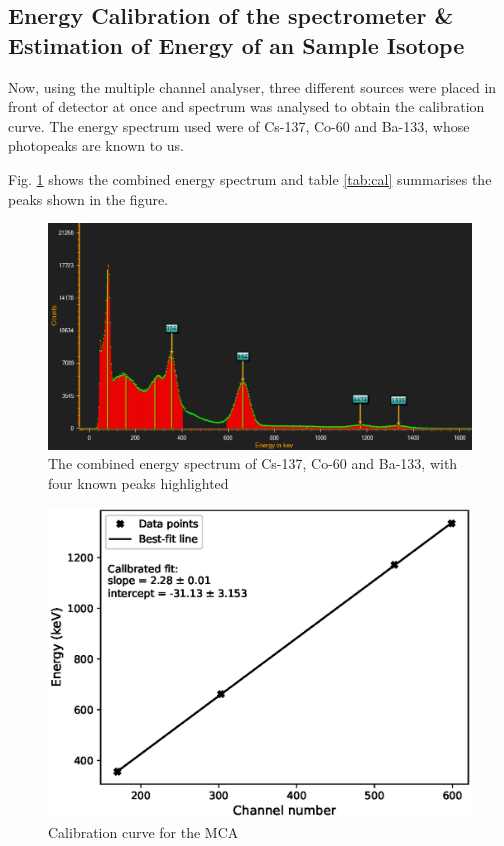 \subsection{Energy Calibration of the spectrometer \& Estimation of Energy of an Sample Isotope}

Now, using the multiple channel analyser, three different sources were placed in front of detector at once and spectrum was analysed to obtain the calibration curve. The energy spectrum used were of Cs-137, Co-60 and Ba-133, whose photopeaks are known to us.

Fig. \ref{cal} shows the combined energy spectrum and table \ref{tab:cal} summarises the peaks shown in the figure.

\begin{figure}[H]
    \centering
    \includegraphics[width=1\columnwidth]{images/calibration.png}
    \caption{The combined energy spectrum of Cs-137, Co-60 and Ba-133, with four known peaks highlighted}
    \label{cal}
\end{figure}



\begin{figure}[H]
    \centering
    \includegraphics[width=1\columnwidth]{images/cal.eps}
    \caption{Calibration curve for the MCA}
    \label{calline}
\end{figure}

